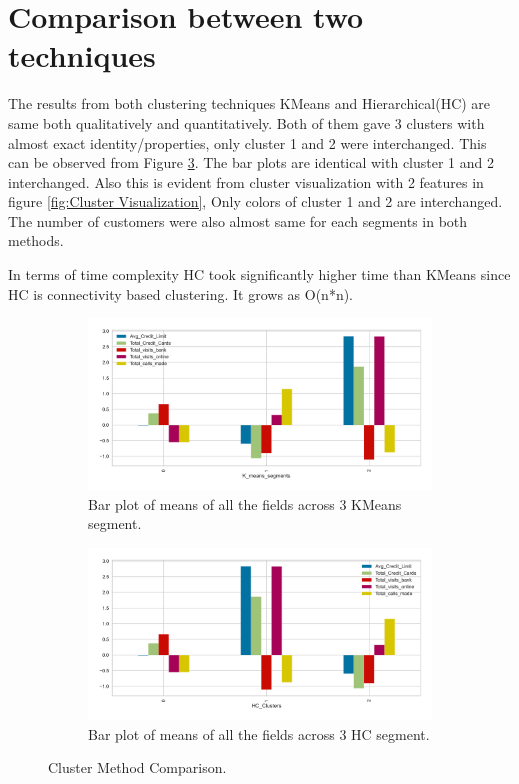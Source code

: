 \documentclass[10pt,a4paper]{style}
\begin{document}
	
	\clearpage
	\newpage	
	\section{Comparison between two techniques}
	
		The results from both clustering techniques KMeans and Hierarchical(HC) are same both qualitatively and quantitatively. Both of them gave 3 clusters with almost exact identity/properties, only cluster 1 and 2 were interchanged. This can be observed from Figure \ref{fig:Cluster Method Comparision}. The bar plots are identical with cluster 1 and 2 interchanged. Also this is evident from cluster visualization with 2 features in figure \ref{fig:Cluster Visualization}, Only colors of cluster 1 and 2 are interchanged. The number of customers were also almost same for each segments in both methods.
		
		In terms of time complexity HC took significantly higher time than KMeans since HC is connectivity based clustering. It grows as O(n*n). 
	
		\begin{figure}[h]
			\centering
			\begin{subfigure}[t]{0.49\textwidth}
				\includegraphics[width=\textwidth]{Kmens_segement_profile_bar.png}
				\caption{Bar plot of means of all the fields across 3 KMeans segment.}
				\label{fig:Kmens_segement_profile_bar.png}
			\end{subfigure}
			\hfill
			\begin{subfigure}[t]{0.49\textwidth}
				\includegraphics[width=\textwidth]{HC_Clusters_profilr_bar.png}
				\caption{Bar plot of means of all the fields across 3 HC segment.}
				\label{fig:HC_Clusters_profilr_bar.png}
			\end{subfigure}
			\caption{Cluster Method Comparison.}
			\label{fig:Cluster Method Comparision}
		\end{figure}
	
\end{document}
